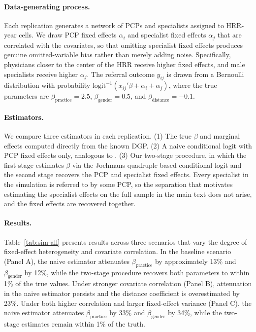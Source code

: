 \documentclass[12pt]{article}
\begin{document}
\paragraph{Data-generating process.} Each replication generates a network of PCPs and specialists assigned to HRR-year cells. We draw PCP fixed effects $\alpha_i$ and specialist fixed effects $\alpha_j$ that are correlated with the covariates, so that omitting specialist fixed effects produces genuine omitted-variable bias rather than merely adding noise. Specifically, physicians closer to the center of the HRR receive higher fixed effects, and male specialists receive higher $\alpha_j$. The referral outcome $y_{ij}$ is drawn from a Bernoulli distribution with probability $\text{logit}^{-1}(x_{ij}'\beta + \alpha_i + \alpha_j)$, where the true parameters are $\beta_{\text{practice}} = 2.5$, $\beta_{\text{gender}} = 0.5$, and $\beta_{\text{distance}} = -0.1$.

\paragraph{Estimators.} We compare three estimators in each replication. (1) The true $\beta$ and marginal effects computed directly from the known DGP. (2) A naive conditional logit with PCP fixed effects only, analogous to \cite{zeltzer2020}. (3) Our two-stage procedure, in which the first stage estimates $\beta$ via the Jochmans quadruple-based conditional logit and the second stage recovers the PCP and specialist fixed effects. Every specialist in the simulation is referred to by some PCP, so the separation that motivates estimating the specialist effects on the full sample in the main text does not arise, and the fixed effects are recovered together.

\paragraph{Results.} Table~\ref{tab:sim-all} presents results across three scenarios that vary the degree of fixed-effect heterogeneity and covariate correlation. In the baseline scenario (Panel A), the naive estimator attenuates $\beta_{\text{practice}}$ by approximately 13\% and $\beta_{\text{gender}}$ by 12\%, while the two-stage procedure recovers both parameters to within 1\% of the true values. Under stronger covariate correlation (Panel B), attenuation in the naive estimator persists and the distance coefficient is overestimated by 23\%. Under both higher correlation and larger fixed-effect variance (Panel C), the naive estimator attenuates $\beta_{\text{practice}}$ by 33\% and $\beta_{\text{gender}}$ by 34\%, while the two-stage estimates remain within 1\% of the truth.
\end{document}
